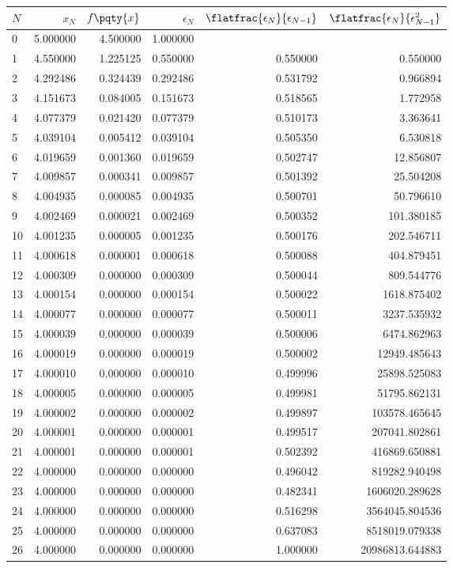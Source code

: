 \begin{tabular}{lrrrrr}
\toprule
\(N\) & \(x_N\) & \(f\pqty{x}\) & \(\epsilon_N\) & \(\flatfrac{\epsilon_N}{\epsilon_{N - 1}}\) & \(\flatfrac{\epsilon_N}{\epsilon_{N - 1}^2}\) \\
\midrule
0 & 5.000000 & 4.500000 & 1.000000 & & \\
1 & 4.550000 & 1.225125 & 0.550000 & 0.550000 & 0.550000 \\
2 & 4.292486 & 0.324439 & 0.292486 & 0.531792 & 0.966894 \\
3 & 4.151673 & 0.084005 & 0.151673 & 0.518565 & 1.772958 \\
4 & 4.077379 & 0.021420 & 0.077379 & 0.510173 & 3.363641 \\
5 & 4.039104 & 0.005412 & 0.039104 & 0.505350 & 6.530818 \\
6 & 4.019659 & 0.001360 & 0.019659 & 0.502747 & 12.856807 \\
7 & 4.009857 & 0.000341 & 0.009857 & 0.501392 & 25.504208 \\
8 & 4.004935 & 0.000085 & 0.004935 & 0.500701 & 50.796610 \\
9 & 4.002469 & 0.000021 & 0.002469 & 0.500352 & 101.380185 \\
10 & 4.001235 & 0.000005 & 0.001235 & 0.500176 & 202.546711 \\
11 & 4.000618 & 0.000001 & 0.000618 & 0.500088 & 404.879451 \\
12 & 4.000309 & 0.000000 & 0.000309 & 0.500044 & 809.544776 \\
13 & 4.000154 & 0.000000 & 0.000154 & 0.500022 & 1618.875402 \\
14 & 4.000077 & 0.000000 & 0.000077 & 0.500011 & 3237.535932 \\
15 & 4.000039 & 0.000000 & 0.000039 & 0.500006 & 6474.862963 \\
16 & 4.000019 & 0.000000 & 0.000019 & 0.500002 & 12949.485643 \\
17 & 4.000010 & 0.000000 & 0.000010 & 0.499996 & 25898.525083 \\
\midrule
18 & 4.000005 & 0.000000 & 0.000005 & 0.499981 & 51795.862131 \\
19 & 4.000002 & 0.000000 & 0.000002 & 0.499897 & 103578.465645 \\
20 & 4.000001 & 0.000000 & 0.000001 & 0.499517 & 207041.802861 \\
21 & 4.000001 & 0.000000 & 0.000001 & 0.502392 & 416869.650881 \\
22 & 4.000000 & 0.000000 & 0.000000 & 0.496042 & 819282.940498 \\
23 & 4.000000 & 0.000000 & 0.000000 & 0.482341 & 1606020.289628 \\
24 & 4.000000 & 0.000000 & 0.000000 & 0.516298 & 3564045.804536 \\
25 & 4.000000 & 0.000000 & 0.000000 & 0.637083 & 8518019.079338 \\
26 & 4.000000 & 0.000000 & 0.000000 & 1.000000 & 20986813.644883 \\
\bottomrule
\end{tabular}
